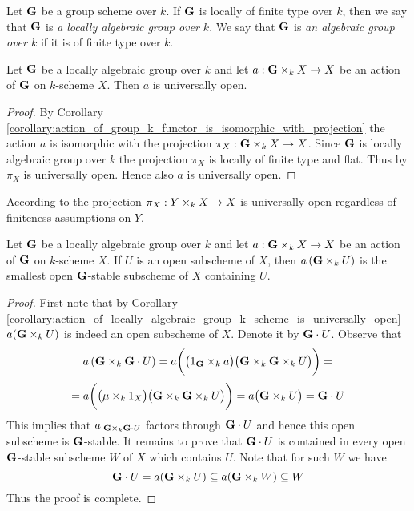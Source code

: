 \begin{definition}
Let $\mathbf{G}$ be a group scheme over $k$. If $\mathbf{G}$ is locally of finite type over $k$, then we say that $\mathbf{G}$ is \textit{a locally algebraic group over $k$}. We say that $\mathbf{G}$ is \textit{an algebraic group over $k$} if it is of finite type over $k$.
\end{definition}

\begin{corollary}\label{corollary:action_of_locally_algebraic_group_k_scheme_is_universally_open}
Let $\mathbf{G}$ be a locally algebraic group over $k$ and let $a:\mathbf{G}\times_k X\rightarrow X$ be an action of $\mathbf{G}$ on $k$-scheme $X$. Then $a$ is universally open.
\end{corollary}
\begin{proof}
By Corollary \ref{corollary:action_of_group_k_functor_is_isomorphic_with_projection} the action $a$ is isomorphic with the projection $\pi_X:\mathbf{G}\times_kX\rightarrow X$. Since $\mathbf{G}$ is locally algebraic group over $k$ the projection $\pi_X$ is locally of finite type and flat. Thus by {\cite[Theorem 14.33]{gortz2010algebraic}} $\pi_X$ is universally open. Hence also $a$ is universally open.
\end{proof}

\begin{remark}\label{remark:projections_over_field_are_universally_open}
According to {\cite[Corollary 5.45]{gortz2010algebraic}} the projection $\pi_X:Y\times_kX\rightarrow X$ is universally open regardless of finiteness assumptions on $Y$.
\end{remark}

\begin{corollary}\label{corollary:for_actions_of_locally_algebraic_groups_there_is_the_smallest_open_stable_subscheme_containing_given_open_subscheme}
Let $\mathbf{G}$ be a locally algebraic group over $k$ and let $a:\mathbf{G}\times_k X\rightarrow X$ be an action of $\mathbf{G}$ on $k$-scheme $X$. If $U$ is an open subscheme of $X$, then $a\left(\mathbf{G}\times_kU\right)$ is the smallest open $\mathbf{G}$-stable subscheme of $X$ containing $U$.
\end{corollary}
\begin{proof}
First note that by Corollary \ref{corollary:action_of_locally_algebraic_group_k_scheme_is_universally_open} $a(\mathbf{G}\times_kU)$ is indeed an open subscheme of $X$. Denote it by $\mathbf{G}\cdot U$. Observe that
$$a\left(\mathbf{G}\times_k \mathbf{G}\cdot U\right) = a\bigg(\big(1_{\mathbf{G}}\times_ka\big)\big(\mathbf{G}\times_k\mathbf{G}\times_kU\big)\bigg)=$$
$$= a\bigg(\big(\mu \times_k 1_X\big)\big(\mathbf{G}\times_k\mathbf{G}\times_kU\big)\bigg) = a\big(\mathbf{G}\times_kU\big) = \mathbf{G}\cdot U$$
This implies that $a_{\mid \mathbf{G}\times_k \mathbf{G}\cdot U}$ factors through $\mathbf{G}\cdot U$ and hence this open subscheme is $\mathbf{G}$-stable. It remains to prove that $\mathbf{G}\cdot U$ is contained in every open $\mathbf{G}$-stable subscheme $W$ of $X$ which contains $U$. Note that for such $W$ we have
$$\mathbf{G}\cdot U = a(\mathbf{G}\times_kU) \subseteq a(\mathbf{G}\times_kW) \subseteq W$$
Thus the proof is complete.
\end{proof}

